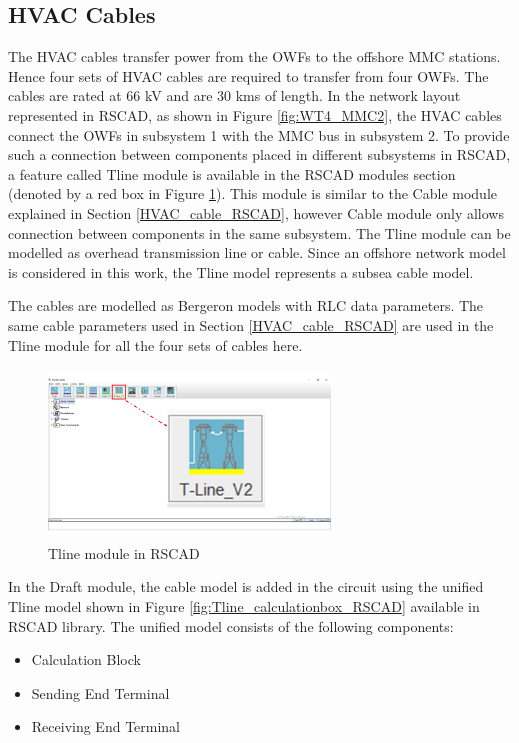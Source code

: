 \subsection{HVAC Cables}\label{Tline_cable_RSCAD}
The \gls{HVAC} cables transfer power from the \gls{OWF}s to the offshore \gls{MMC} stations. Hence four sets of \gls{HVAC} cables are required to transfer from four \gls{OWF}s. The cables are rated at 66 kV and are 30 kms of length. In the network layout represented in RSCAD, as shown in Figure \ref{fig:WT4_MMC2}, the \gls{HVAC} cables connect the \gls{OWF}s in subsystem 1 with the \gls{MMC} bus in subsystem 2. To provide such a connection between components placed in different subsystems in RSCAD, a feature called Tline module is available in the RSCAD modules section (denoted by a red box in Figure \ref{fig:TlineModule_mark}). This module is similar to the Cable module explained in Section \ref{HVAC_cable_RSCAD}, however Cable module only allows connection between components in the same subsystem. The Tline module can be modelled as overhead transmission line or cable. Since an offshore network model is considered in this work, the Tline model represents a subsea cable model. 

The cables are modelled as Bergeron models with RLC data parameters. The same cable parameters used in Section \ref{HVAC_cable_RSCAD} are used in the Tline module for all the four sets of cables here. 
 
 \begin{figure}[H]
\centering
    \includegraphics[height = 4.5cm,width = 7.5cm]{Diagrams/Chapter_4/Tline_module_Final.png}
    \caption{Tline module in RSCAD}
    \label{fig:TlineModule_mark}
\end{figure}
 
 In the Draft module, the cable model is added in the circuit using the unified Tline model shown in Figure \ref{fig:Tline_calculationbox_RSCAD} available in RSCAD library. The unified model consists of the following components: 
    \begin{itemize}[noitemsep]
    \item Calculation Block
    \item Sending End Terminal
    \item Receiving End Terminal
\end{itemize}

